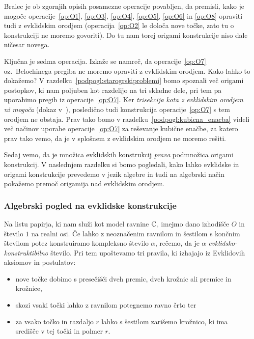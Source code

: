 Bralec je ob zgornjih opisih posamezne operacije povabljen, da premisli, kako je mogoče operacije~\ref{op:O1}, \ref{op:O3}, \ref{op:O4}, \ref{op:O5}, \ref{op:O6} in \ref{op:O8} opraviti tudi z evklidskim orodjem (operacija~\ref{op:O2} le določa nove točke, zato tu o konstrukciji ne moremo govoriti). Do tu nam torej origami konstrukcije niso dale ničesar novega.

Ključna je sedma operacija. Izkaže se namreč, da operacije~\ref{op:O7} oz.\ Belochinega pregiba ne moremo opraviti z evklidskim orodjem. Kako lahko to dokažemo? V razdelku~\ref{podpogl:starogrskiproblemi} bomo spoznali več origami postopkov, ki nam poljuben kot razdelijo na tri skladne dele, pri tem pa uporabimo pregib iz operacije~\ref{op:O7}. Ker \emph{trisekcija kota z evklidskim orodjem ni mogoča} (dokaz v~\cite[str.\ 77--78]{jerman1998}), posledično tudi konstrukcija operacije~\ref{op:O7} s tem orodjem ne obstaja. Prav tako bomo v razdelku~\ref{podpogl:kubicna_enacba} videli več načinov uporabe operacije~\ref{op:O7} za reševanje kubične enačbe, za katero prav tako vemo, da je v splošnem z evklidskim orodjem ne moremo rešiti.

Sedaj vemo, da je množica evklidskih konstrukcij \emph{prava} podmnožica origami konstrukcij. V naslednjem razdelku si bomo pogledali, kako lahko evklidske in origami konstrukcije prevedemo v jezik algebre in tudi na algebrski način pokažemo premoč origamija nad evklidskim orodjem.

\subsubsection{Algebrski pogled na evklidske konstrukcije}
\label{podpogl:evkl_konstruktibilnost}

\begin{definicija}
    Na listu papirja, ki nam služi kot model ravnine $\mathbb C$, imejmo dano izhodišče $O$ in število $1$ na realni osi. Če lahko z neoznačenim ravnilom in šestilom s končnim številom potez konstruiramo kompleksno število $\alpha$, rečemo, da je $\alpha$ \emph{evklidsko-konstruktibilno} število. Pri tem upoštevamo tri pravila, ki izhajajo iz Evklidovih aksiomov in postulatov:
    \begin{itemize}
        \item nove točke dobimo s presečišči dveh premic, dveh krožnic ali premice in krožnice,
        \item skozi vsaki točki lahko z ravnilom potegnemo ravno črto ter
        \item za vsako točko in razdaljo $r$ lahko s šestilom zarišemo krožnico, ki ima središče v tej točki in polmer $r$.
    \end{itemize}
\end{definicija}

